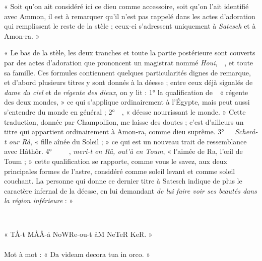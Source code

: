 \documentclass{article}
\newcommand*\hieroAAAM{}
\newcommand*\hieroAAAV{}
\newcommand*\hieroAAAW{}
\newcommand*\hieroAAAY{}
\newcommand*\hieroAABX{}
\newcommand*\hieroAABY{}
\newcommand*\hieroAABZ{}
\newcommand*\hieroAACA{\raisebox{0.3ex}{}}
\newcommand*\hieroAACB{}
\newcommand*\hieroAACC{}
\newcommand*\hieroAACD{}
\newcommand*\hieroAACE{}
\newcommand*\hieroAACF{}
\newcommand*\hieroAACG{}
\newcommand*\hieroAACH{}
\newcommand*\hieroAACI{}
\newcommand*\hieroAACJ{}
\newcommand*\hieroAACK{}
\newcommand*\hieroAACL{\raisebox{0.3ex}{}}
\newcommand*\hieroAACM{}
\newcommand*\hieroAACN{}
\newcommand*\hieroAACO{\raisebox{0.3ex}{}}
\newcommand*\hieroAACP{}
\newcommand*\hieroAACQ{}
\newcommand*\hieroAACR{\raisebox{0.9ex}{}}
\newcommand*\hieroAACS{}
\newcommand*\hieroAACT{\raisebox{0.4ex}{}}
\begin{document}
« Soit qu'on ait considéré ici ce dieu comme accessoire, soit qu'on l'ait identifié avec Ammon, il est à remarquer qu'il n'est pas rappelé dans les actes d'adoration qui remplissent le reste de la stèle ; ceux-ci s'adressent uniquement à \emph{Satesch} et à Amon-ra. »

« Le bas de la stèle, les deux tranches et toute la partie postérieure sont couverts par des actes d'adoration que prononcent un magistrat nommé \emph{Houi}, $\hieroAABX\:\hieroAAAW\:\hieroAAAW\:\hieroAABY$, et toute sa famille. Ces formules contiennent quelques particularités dignes de remarque, et d'abord plusieurs titres y sont donnés à la déesse ; entre ceux déjà signalés de \emph{dame du ciel} et de \emph{régente des dieux}, on y lit : 1° la qualification de $\hieroAABZ\:\hieroAACA$ « régente des deux mondes, » ce qui s'applique ordinairement à l'Égypte, mais peut aussi s'entendre du monde en général ; 2° $\hieroAAAM\:\hieroAACB\:\hieroAACC\:\hieroAACD$, « déesse nourrissant le monde. » Cette traduction, donnée par Champollion, me laisse des doutes ; c'est d'ailleurs un titre qui appartient ordinairement à Amon-ra, comme dieu suprême. 3° $\hieroAACE\:\hieroAAAW\:\hieroAACF\:\hieroAACG\:\hieroAAAY$ \emph{Scherå-t our Rå}, « fille aînée du Soleil ; » ce qui est un nouveau trait de ressemblance avec Hâthôr. 4° $\hieroAACH\:\hieroAACI\:\hieroAACG\:\hieroAAAY\:\hieroAACJ\:\hieroAACK\:\hieroAACL\:\hieroAACM\:\hieroAACJ\:\hieroAAAV$, \emph{meri-t en Rå, out'å en Toum}, « l'aimée de Ra, l'œil de Toum ; » cette qualification se rapporte, comme vous le savez, aux deux principales formes de l'astre, considéré comme soleil levant et comme soleil couchant. La personne qui donne ce dernier titre à Satesch indique de plus le caractère infernal de la déesse, en lui demandant \emph{de lui faire voir ses beautés dans la région inférieure} : »

\begin{center}
$\hieroAACN\:\:\:\:\:\hieroAACO\:\hieroAACP\:\hieroAACP\:\:\:\:\:\:\hieroAABY\:\:\:\:\:\:\hieroAACQ\:\hieroAACQ\:\hieroAACQ\:\hieroAACR\:\:\:\:\:\:\hieroAACS\:\:\:\:\:\:\hieroAACT$
\end{center}

\begin{center}
« TÅ-t MÅÅ-å NoWRe-ou-t åM NeTeR KeR. »
\end{center}

\paragraph{}
Mot à mot : « Da videam decora tua in orco. »
\end{document}
